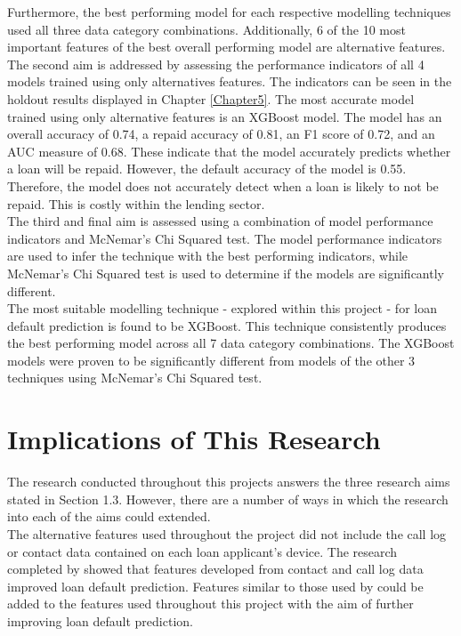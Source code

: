 Furthermore, the best performing model for each respective modelling techniques used all three data category combinations. Additionally, 6 of the 10 most important features of the best overall performing model are alternative features. \\

The second aim is addressed by assessing the performance indicators of all 4 models trained using only alternatives features. The indicators can be seen in the holdout results displayed in Chapter \ref{Chapter5}. The most accurate model trained using only alternative features is an XGBoost model. The model has an overall accuracy of 0.74, a repaid accuracy of 0.81, an F1 score of 0.72, and an AUC measure of 0.68. These indicate that the model accurately predicts whether a loan will be repaid. However, the default accuracy of the model is 0.55. Therefore, the model does not accurately detect when a loan is likely to not be repaid. This is costly within the lending sector. \\

The third and final aim is assessed using a combination of model performance indicators and McNemar's Chi Squared test. The model performance indicators are used to infer the technique with the best performing indicators, while McNemar's Chi Squared test is used to determine if the models are significantly different. \\

The most suitable modelling technique - explored within this project - for loan default prediction is found to be XGBoost. This technique consistently produces the best performing model across all 7 data category combinations. The XGBoost models were proven to be significantly different from models of the other 3 techniques using McNemar's Chi Squared test. 


\section{Implications of This Research}

The research conducted throughout this projects answers the three research aims stated in Section 1.3. However, there are a number of ways in which the research into each of the aims could extended. \\

The alternative features used throughout the project did not include the call log or contact data contained on each loan applicant's device. The research completed by \textcite{BigDataMicroFiance} showed that features developed from contact and call log data improved loan default prediction. Features similar to those used by \textcite{BigDataMicroFiance} could be added to the features used throughout this project  with the aim of further improving loan default prediction. \\

